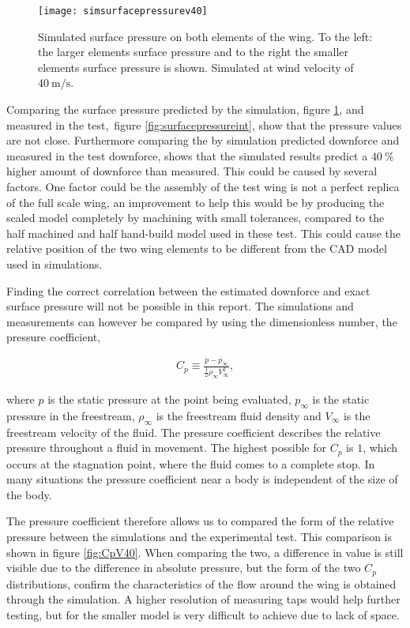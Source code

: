   \begin{figure}
    \texttt{[image: simsurfacepressurev40]}
    \caption{Simulated surface pressure on both elements of the wing. To the left: the larger elements surface pressure and to the right the smaller elements surface pressure is shown. Simulated at wind velocity of $\SI{40}{\metre\per\second}$.}
    \label{fig:simsurfacepressurev40}
  \end{figure}

  Comparing the surface pressure predicted by the simulation, figure \ref{fig:simsurfacepressurev40}, and measured in the test, figure \ref{fig:surfacepressureint}, show that the pressure values are not close. Furthermore comparing the by simulation predicted downforce and measured in the test downforce, shows that the simulated results predict a $\SI{40}{\%}$ higher amount of downforce than measured. This could be caused by several factors. One factor could be the assembly of the test wing is not a perfect replica of the full scale wing, an improvement to help this would be by producing the scaled model completely by machining with small tolerances, compared to the half machined and half hand-build model used in these test. This could cause the relative position of the two wing elements to be different from the CAD model used in simulations.

  Finding the correct correlation between the estimated downforce and exact surface pressure will not be possible in this report. The simulations and measurements can however be compared by using the dimensionless number, the pressure coefficient,

  \begin{align}
    C_p \equiv \frac{p-p_{\infty}}{\frac{1}{2}\rho_{\infty}V_{\infty}^2},
  \end{align}

  where $p$ is the static pressure at the point being evaluated, $p_{\infty}$ is the static pressure in the freestream, $\rho_{\infty}$ is the freestream fluid density and $V_{\infty}$ is the freestream velocity of the fluid. The pressure coefficient describes the relative pressure throughout a fluid in movement. The highest possible for $C_p$ is $1$, which occurs at the stagnation point, where the fluid comes to a complete stop. In many situations the pressure coefficient near a body is independent of the size of the body. 

  The pressure coefficient therefore allows us to compared the form of the relative pressure between the simulations and the experimental test. This comparison is shown in figure \ref{fig:CpV40}. When comparing the two, a difference in value is still visible due to the difference in absolute pressure, but the form of the two $C_p$ distributions, confirm the characteristics of the flow around the wing is obtained through the simulation. A higher resolution of measuring taps would help further testing, but for the smaller model is very difficult to achieve due to lack of space. 

